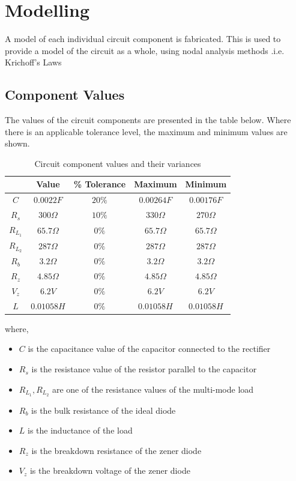 \section{Modelling}
A model of each individual circuit component is fabricated. This is used to provide a model of the circuit as a whole, using nodal analysis methods .i.e. Krichoff's Laws

\subsection{Component Values}
The values of the circuit components are presented in the table below. Where there is an applicable tolerance level, the maximum and minimum values are shown. 
\begin{table}[H]
    \centering
    \begin{tabular}{|c|c|c||c|c|}\hline
        & Value & \% Tolerance & \textbf{Maximum} & \textbf{Minimum} \\\hline
       $C$ & $0.0022 F$ & $20\%$ & $0.00264F$ & $0.00176F$ \\
       $R_s$ & $300\Omega$ & $10\%$ & $330\Omega$ & $270\Omega$ \\
       $R_{L_1}$ & $65.7\Omega$ & $0\%$ & $65.7\Omega$  & $65.7\Omega$ \\
       $R_{L_2}$ & $287\Omega$ & $0\%$ & $287\Omega$ & $287\Omega$ \\
       $R_b$ & $3.2 \Omega$ & $0\%$ & $3.2 \Omega$ & $3.2 \Omega$ \\
       $R_z$ & $4.85 \Omega$ & $0\%$ & $4.85 \Omega$ & $4.85 \Omega$ \\
       $V_z$ & $6.2 V$ & $0\%$ & $6.2 V$ & $6.2 V$ \\
       $L$ & $0.01058 H$ & $0\%$ & $0.01058 H$ & $0.01058 H$ \\\hline
    \end{tabular}
    \caption{Circuit component values and their variances}
    \label{tab:component_values}
\end{table}
where,
\begin{itemize}
	\item $C$ is the capacitance value of the capacitor connected to the rectifier
	\item $R_s$ is the resistance value of the resistor parallel to the capacitor
	\item $R_{L_1}, R_{L_2}$ are one of the resistance values of the multi-mode load
	\item $R_b$ is the bulk resistance of the ideal diode
	\item $L$ is the inductance of the load
	\item $R_z$ is the breakdown resistance of the zener diode
	\item $V_z$ is the breakdown voltage of the zener diode
\end{itemize}

